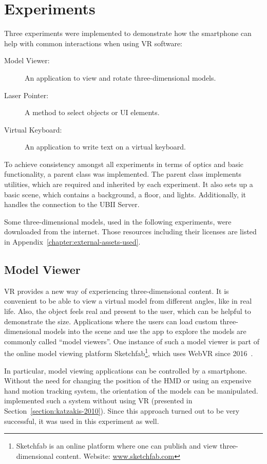 \chapter{Experiments}\label{chapter:experiments}

Three experiments were implemented to demonstrate how the smartphone can help with common interactions when using \gls{VR} software:

\begin{description}
  \item[Model Viewer:] An application to view and rotate three-dimensional models.
  \item[Laser Pointer:] A method to select objects or \gls{UI} elements.
  \item[Virtual Keyboard:] An application to write text on a virtual keyboard.
\end{description}

To achieve consistency amongst all experiments in terms of optics and basic functionality, a parent class was implemented. The parent class implements utilities, which are required and inherited by each experiment. It also sets up a basic scene, which contains a background, a floor, and lights. Additionally, it handles the connection to the \gls{UBII} Server.

Some three-dimensional models, used in the following experiments, were downloaded from the internet. Those resources including their licenses are listed in Appendix~\ref{chapter:external-assets-used}.


\section{Model Viewer}\label{section:model-viewer}
\gls{VR} provides a new way of experiencing three-dimensional content. It is convenient to be able to view a virtual model from different angles, like in real life. Also, the object feels real and present to the user, which can be helpful to demonstrate the size. Applications where the users can load custom three-dimensional models into the scene and use the app to explore the models are commonly called \enquote{model viewers}. One instance of such a model viewer is part of the online model viewing platform Sketchfab\footnote{Sketchfab is an online platform where one can publish and view three-dimensional content. Website: \href{https://sketchfab.com}{www.sketchfab.com}}, which uses Web\gls{VR} since 2016~\cite{Denoyel.2016}. 

In particular, model viewing applications can be controlled by a smartphone. Without the need for changing the position of the \gls{HMD} or using an expensive hand motion tracking system, the orientation of the models can be manipulated.
\citeauthor{Katzakis.2010} implemented such a system without using \gls{VR} (presented in Section~\ref{section:katzakis-2010}). Since this approach turned out to be very successful, it was used in this experiment as well.

